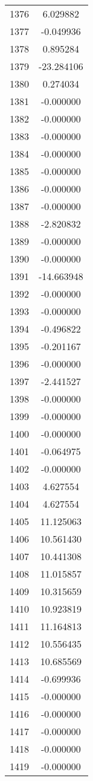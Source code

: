 \documentclass[12pt]{article}
\begin{document}
\begin{longtable}{@{}cc@{}}
1376 & 6.029882 \\
1377 & -0.049936 \\
1378 & 0.895284 \\
1379 & -23.284106 \\
1380 & 0.274034 \\
1381 & -0.000000 \\
1382 & -0.000000 \\
1383 & -0.000000 \\
1384 & -0.000000 \\
1385 & -0.000000 \\
1386 & -0.000000 \\
1387 & -0.000000 \\
1388 & -2.820832 \\
1389 & -0.000000 \\
1390 & -0.000000 \\
1391 & -14.663948 \\
1392 & -0.000000 \\
1393 & -0.000000 \\
1394 & -0.496822 \\
1395 & -0.201167 \\
1396 & -0.000000 \\
1397 & -2.441527 \\
1398 & -0.000000 \\
1399 & -0.000000 \\
1400 & -0.000000 \\
1401 & -0.064975 \\
1402 & -0.000000 \\
1403 & 4.627554 \\
1404 & 4.627554 \\
1405 & 11.125063 \\
1406 & 10.561430 \\
1407 & 10.441308 \\
1408 & 11.015857 \\
1409 & 10.315659 \\
1410 & 10.923819 \\
1411 & 11.164813 \\
1412 & 10.556435 \\
1413 & 10.685569 \\
1414 & -0.699936 \\
1415 & -0.000000 \\
1416 & -0.000000 \\
1417 & -0.000000 \\
1418 & -0.000000 \\
1419 & -0.000000 \\

\end{longtable}
\end{document}
